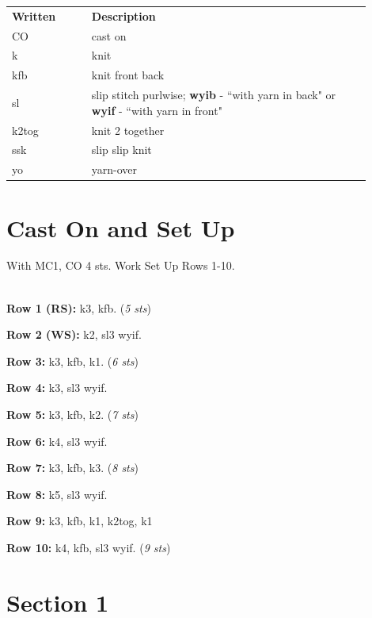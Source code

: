 \documentclass[12pt]{article}
\renewcommand{\arraystretch}{2} %
\newcommand{\rowDir}[1]{\textbf{#1:}} %
\newcommand{\stitchcount}[1]{(\emph{#1 sts})}
\begin{document}
\begin{multicols}{2}
\begin{center}
{\renewcommand{\arraystretch}{1.5}
\begin{tabular}{| C{0.2\linewidth}  p{0.7\linewidth} | }
\thickhline {} 
\textbf{Written}	& \textbf{Description} \\ \thickhline
CO 	& cast on \\
k	& knit \\
kfb 	& knit front back \\
sl 	& slip stitch purlwise; \textbf{wyib} - ``with yarn in back" or \textbf{wyif} - ``with yarn in front" \\
k2tog 	& knit 2 together \\
ssk		& slip slip knit \\
yo		& yarn-over  \\
\hline
\end{tabular}
}
\end{center}


\section*{Cast On and Set Up}

With MC1, CO 4 sts. Work Set Up Rows 1-10.

~\\
\rowDir{Row 1 (RS)} k3, kfb. \stitchcount{5}

\rowDir{Row 2 (WS)} k2, sl3 wyif.

\rowDir{Row 3} k3, kfb, k1. \stitchcount{6}

\rowDir{Row 4} k3, sl3 wyif.

\rowDir{Row 5} k3, kfb, k2. \stitchcount{7}

\rowDir{Row 6} k4, sl3 wyif.

\rowDir{Row 7} k3, kfb, k3. \stitchcount{8}

\rowDir{Row 8} k5, sl3 wyif.

\rowDir{Row 9} k3, kfb, k1, k2tog, k1

\rowDir{Row 10} k4, kfb, sl3 wyif. \stitchcount{9}


\section*{Section 1}


\end{multicols}
\end{document}
